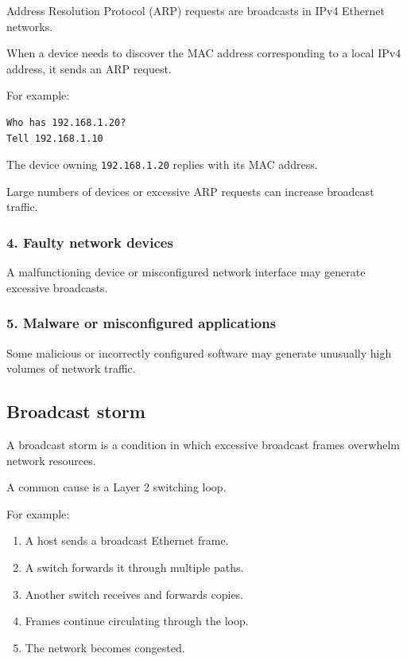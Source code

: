 Address Resolution Protocol (ARP) requests are broadcasts in IPv4 Ethernet networks.

When a device needs to discover the MAC address corresponding to a local IPv4 address, it sends an ARP request.

For example:

\begin{lstlisting}
Who has 192.168.1.20?
Tell 192.168.1.10
\end{lstlisting}

The device owning \texttt{192.168.1.20} replies with its MAC address.

Large numbers of devices or excessive ARP requests can increase broadcast traffic.

\subsubsection{4. Faulty network devices}

A malfunctioning device or misconfigured network interface may generate excessive broadcasts.

\subsubsection{5. Malware or misconfigured applications}

Some malicious or incorrectly configured software may generate unusually high volumes of network traffic.

\subsection{Broadcast storm}

A broadcast storm is a condition in which excessive broadcast frames overwhelm network resources.

A common cause is a Layer 2 switching loop.

For example:

\begin{enumerate}
\item A host sends a broadcast Ethernet frame.
\item A switch forwards it through multiple paths.
\item Another switch receives and forwards copies.
\item Frames continue circulating through the loop.
\item The network becomes congested.
\end{enumerate}

